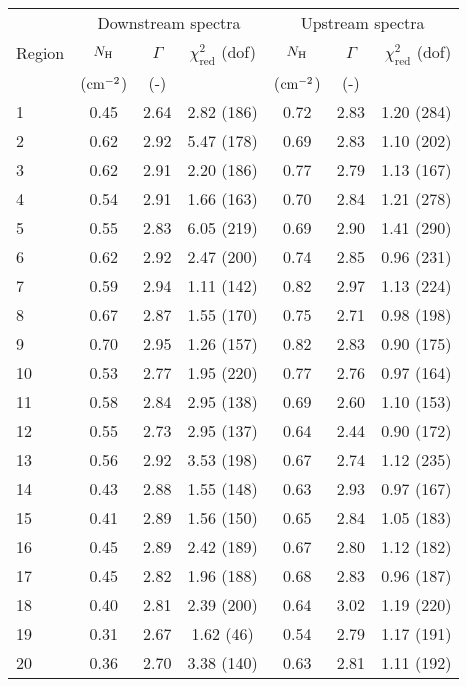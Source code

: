 \begin{tabular}{@{}lcccccr@{}}
\toprule
{} & \multicolumn{3}{c}{Downstream spectra}
   & \multicolumn{3}{c}{Upstream spectra} \\
\cmidrule(lr){2-4} \cmidrule(l){5-7}
Region & $N_{\mathrm{H}}$ & $\Gamma$ & $\chi^2_{\mathrm{red}}$ (dof)
       & $N_{\mathrm{H}}$ & $\Gamma$ & $\chi^2_{\mathrm{red}}$ (dof) \\
{} & ($\mathrm{cm}^{-2}$) & (-) & {}
   & ($\mathrm{cm}^{-2}$) & (-) & {} \\
\midrule
1  & 0.45 & 2.64 & 2.82 (186) & 0.72 & 2.83 & 1.20 (284) \\
2  & 0.62 & 2.92 & 5.47 (178) & 0.69 & 2.83 & 1.10 (202) \\
3  & 0.62 & 2.91 & 2.20 (186) & 0.77 & 2.79 & 1.13 (167) \\
\cmidrule{1-7}
4  & 0.54 & 2.91 & 1.66 (163) & 0.70 & 2.84 & 1.21 (278) \\
5  & 0.55 & 2.83 & 6.05 (219) & 0.69 & 2.90 & 1.41 (290) \\
6  & 0.62 & 2.92 & 2.47 (200) & 0.74 & 2.85 & 0.96 (231) \\
7  & 0.59 & 2.94 & 1.11 (142) & 0.82 & 2.97 & 1.13 (224) \\
8  & 0.67 & 2.87 & 1.55 (170) & 0.75 & 2.71 & 0.98 (198) \\
9  & 0.70 & 2.95 & 1.26 (157) & 0.82 & 2.83 & 0.90 (175) \\
10 & 0.53 & 2.77 & 1.95 (220) & 0.77 & 2.76 & 0.97 (164) \\
\cmidrule{1-7}
11 & 0.58 & 2.84 & 2.95 (138) & 0.69 & 2.60 & 1.10 (153) \\
12 & 0.55 & 2.73 & 2.95 (137) & 0.64 & 2.44 & 0.90 (172) \\
13 & 0.56 & 2.92 & 3.53 (198) & 0.67 & 2.74 & 1.12 (235) \\
\cmidrule{1-7}
14 & 0.43 & 2.88 & 1.55 (148) & 0.63 & 2.93 & 0.97 (167) \\
15 & 0.41 & 2.89 & 1.56 (150) & 0.65 & 2.84 & 1.05 (183) \\
16 & 0.45 & 2.89 & 2.42 (189) & 0.67 & 2.80 & 1.12 (182) \\
17 & 0.45 & 2.82 & 1.96 (188) & 0.68 & 2.83 & 0.96 (187) \\
\cmidrule{1-7}
18 & 0.40 & 2.81 & 2.39 (200) & 0.64 & 3.02 & 1.19 (220) \\
19 & 0.31 & 2.67 & 1.62 (46)  & 0.54 & 2.79 & 1.17 (191) \\
20 & 0.36 & 2.70 & 3.38 (140) & 0.63 & 2.81 & 1.11 (192) \\
\bottomrule
\end{tabular}
